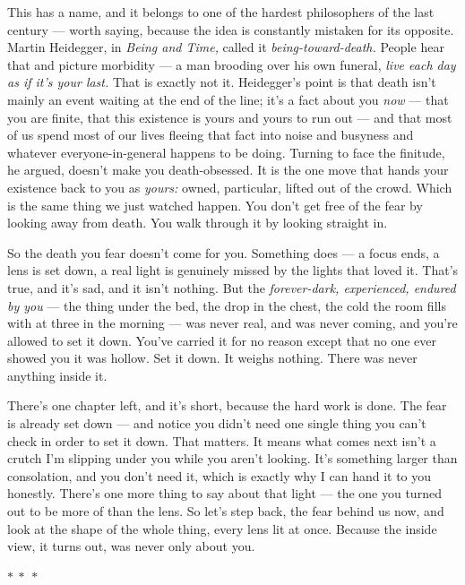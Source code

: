 \documentclass[11pt,openany]{book}
\begin{document}
This has a name, and it belongs to one of the hardest philosophers of the last century — worth saying, because the idea is constantly mistaken for its opposite. Martin Heidegger, in \textit{Being and Time,} called it \textit{being-toward-death.} People hear that and picture morbidity — a man brooding over his own funeral, \textit{live each day as if it’s your last.} That is exactly not it. Heidegger’s point is that death isn’t mainly an event waiting at the end of the line; it’s a fact about you \textit{now} — that you are finite, that this existence is yours and yours to run out — and that most of us spend most of our lives fleeing that fact into noise and busyness and whatever everyone-in-general happens to be doing. Turning to face the finitude, he argued, doesn’t make you death-obsessed. It is the one move that hands your existence back to you as \textit{yours:} owned, particular, lifted out of the crowd. Which is the same thing we just watched happen. You don’t get free of the fear by looking away from death. You walk through it by looking straight in.

So the death you fear doesn’t come for you. Something does — a focus ends, a lens is set down, a real light is genuinely missed by the lights that loved it. That’s true, and it’s sad, and it isn’t nothing. But the \textit{forever-dark, experienced, endured by you} — the thing under the bed, the drop in the chest, the cold the room fills with at three in the morning — was never real, and was never coming, and you’re allowed to set it down. You’ve carried it for no reason except that no one ever showed you it was hollow. Set it down. It weighs nothing. There was never anything inside it.

There’s one chapter left, and it’s short, because the hard work is done. The fear is already set down — and notice you didn’t need one single thing you can’t check in order to set it down. That matters. It means what comes next isn’t a crutch I’m slipping under you while you aren’t looking. It’s something larger than consolation, and you don’t need it, which is exactly why I can hand it to you honestly. There’s one more thing to say about that light — the one you turned out to be more of than the lens. So let’s step back, the fear behind us now, and look at the shape of the whole thing, every lens lit at once. Because the inside view, it turns out, was never only about you.


\medskip\begin{center}\textcolor{rule}{$\ast\ \ast\ \ast$}\end{center}\medskip
\end{document}
